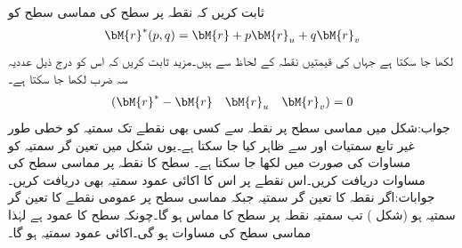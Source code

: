 \quad ثابت کریں کہ نقطہ  پر سطح  کی مماسی سطح کو 
\begin{align}\label{مساوات_سوال_خطی_تکمل_مماسی_سطح_عمومی}
\bM{r}^*(p,q)=\bM{r}+p\bM{r}_u+q\bM{r}_v
\end{align}
لکھا جا سکتا ہے جہاں  کی قیمتیں نقطہ  کے لحاظ سے ہیں۔مزید ثابت کریں کہ اس کو درج ذیل عددیہ سہ ضرب لکھا جا سکتا ہے۔
\begin{align*}
(\bM{r}^*-\bM{r}\quad \bM{r}_u\quad \bM{r}_v)=0
\end{align*}
جواب:\quad شکل  میں مماسی سطح پر نقطہ  سے کسی بھی نقطے تک سمتیہ کو خطی طور غیر تابع سمتیات  اور  سے ظاہر کیا جا سکتا ہے۔یوں شکل  میں  تعین گر سمتیہ  کو  مساوات  کی صورت میں لکھا جا سکتا ہے۔
\quad سطح  کا نقطہ  پر  مماسی سطح کی مساوات دریافت کریں۔اس نقطے پر اس کا اکائی عمود سمتیہ بھی دریافت کریں۔\\
جوابات:\quad اگر نقطہ  کا تعین گر سمتیہ    جبکہ مماسی سطح پر عمومی نقطے کا تعین گر سمتیہ  ہو (شکل ) تب سمتیہ  نقطہ  پر سطح کا مماس ہو گا۔چونکہ  سطح کا عمود ہے لہٰذا مماسی سطح کی مساوات  ہو گی۔اکائی عمود سمتیہ  ہو گا۔ 
